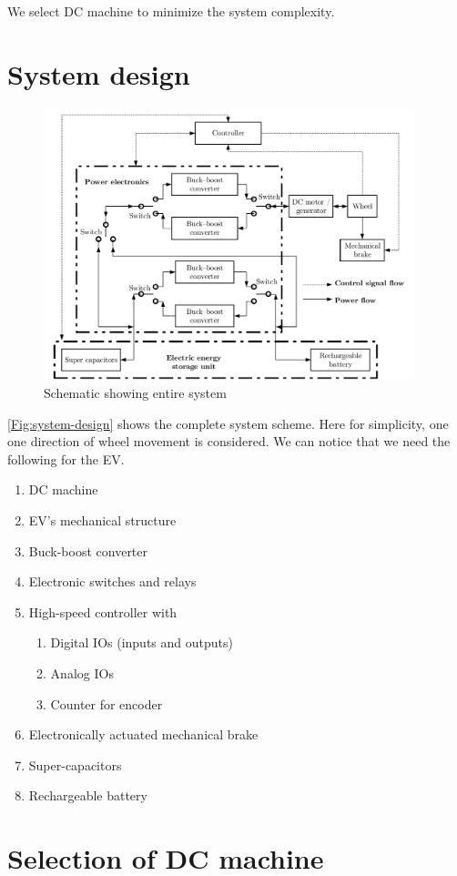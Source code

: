 \documentclass[journal]{IEEEtran}
\begin{document}
We select DC machine to minimize the system complexity.

\section{System design}
\begin{figure}
	\centering
	\includegraphics[width=0.96\textwidth]{system-design-v000}
	\caption{Schematic showing entire system}
	\label{Fig:system-design}
\end{figure}
\autoref{Fig:system-design} shows the complete system scheme. Here for simplicity, one one direction of wheel movement is considered. We can notice that we need the following for the EV.
\begin{tcolorbox}[colback=green!0!white,colframe=green!75!black,title=Requirements]
\begin{enumerate}
  \item DC machine
  \item EV's mechanical structure
  \item Buck-boost converter
  \item Electronic switches and relays
  \item High-speed controller with
\begin{enumerate}
  \item Digital IOs (inputs and outputs)
  \item Analog IOs
  \item Counter for encoder
\end{enumerate}
  \item Electronically actuated mechanical brake
  \item Super-capacitors
  \item Rechargeable battery
\end{enumerate}
\end{tcolorbox}

\section{Selection of DC machine}




\end{document}

